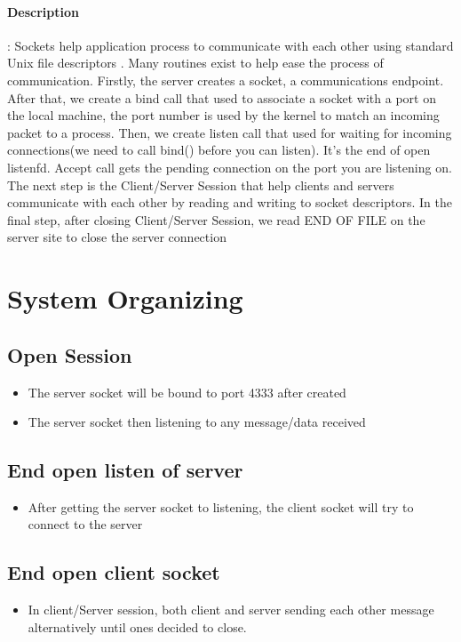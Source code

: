 \documentclass[12pt]{article}
\begin{document}
\paragraph{Description}:
Sockets help application process to communicate with each other using standard Unix file descriptors . Many routines exist to help ease the process of communication. Firstly, the server creates a socket, a communications endpoint. After that, we create a bind call that used to associate a socket with a port on the local machine, the port number is used by the kernel to match an incoming packet to a process. Then, we create listen call that used for waiting for incoming connections(we need to call bind() before you can listen). It’s the end of open listenfd. Accept call gets the pending connection on the port you are listening on. The next step is the Client/Server Session that help clients and servers communicate with each other by reading and writing to socket descriptors. In the final step, after closing Client/Server Session, we read END OF FILE on the server site to close the server connection

\section{System Organizing}
\subsection{Open Session}
\begin{itemize}
	\item The server socket will be bound to port 4333 after created 
	\item The server socket then listening to any message/data received
\end{itemize}
\subsection{End open listen of server}
\begin{itemize}
	\item After getting the server socket to listening, the client socket will try to connect to the server
\end{itemize}
\subsection{End open client socket}
\begin{itemize}
	\item In client/Server session, both client and server sending each other message alternatively until ones decided to close.
\end{itemize}
\end{document}
